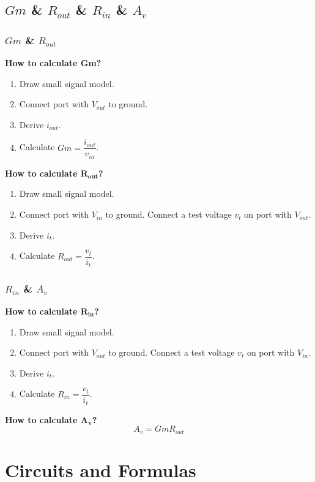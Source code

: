 \documentclass{beamer}
\begin{document}
\subsection{$Gm$ \& $R_{out}$ \& $R_{in}$ \& $A_v$}
\begin{frame}
    \frametitle{$Gm$ \& $R_{out}$}
    \textbf{How to calculate Gm?}
    \begin{enumerate}[1. ]
        \item Draw small signal model.
        \item Connect port with $V_{out}$ to ground.
        \item Derive $i_{out}$.
        \item Calculate $Gm = \dfrac{i_{out}}{v_{in}}$.
    \end{enumerate}
\textbf{How to calculate $\mathbf{R_{out}}$?}
    \begin{enumerate}
        \item Draw small signal model.
        \item Connect port with $V_{in}$ to ground. Connect a test voltage $v_t$ on port with $V_{out}$.
        \item Derive $i_t$.
        \item Calculate $R_{out} = \dfrac{v_t}{i_t}$. 
    \end{enumerate} 
\end{frame}
\begin{frame}
    \frametitle{$R_{in}$ \& $A_v$}
    \textbf{How to calculate $\mathbf{R_{in}}$?}
    \begin{enumerate}
        \item Draw small signal model.
        \item Connect port with $V_{out}$ to ground. Connect a test voltage $v_t$ on port with $V_{in}$.
        \item Derive $i_t$.
        \item Calculate $R_{in} = \dfrac{v_t}{i_t}$. 
    \end{enumerate} 
    \textbf{How to calculate $\mathbf{A_v}$?}
    \begin{equation*}
        A_v = GmR_{out}
    \end{equation*}


\end{frame}

\section{Circuits and Formulas} %
\end{document}
